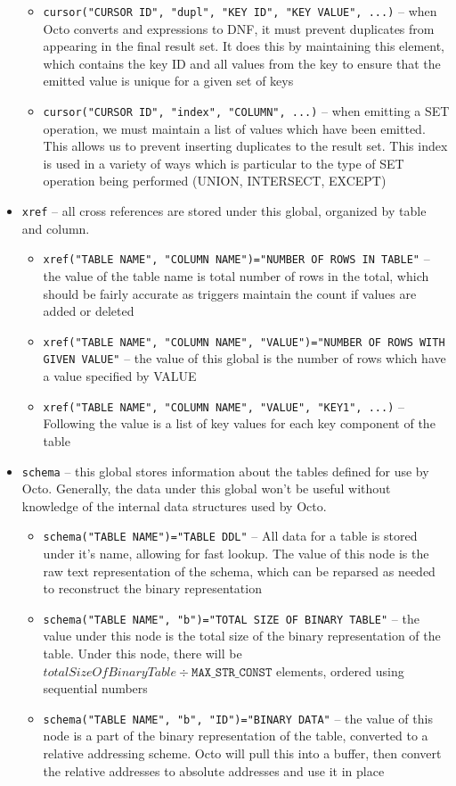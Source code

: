 \documentclass[]{article}
\def\code#1{\texttt{#1}}
\begin{document}
\begin{itemize}
\begin{itemize}
		\item \code{cursor("CURSOR ID", "dupl", "KEY ID", "KEY VALUE", ...)} -- when Octo converts and expressions to DNF, it must prevent duplicates from appearing in the final result set. It does this by maintaining this element, which contains the key ID and all values from the key to ensure that the emitted value is unique for a given set of keys
		\item \code{cursor("CURSOR ID", "index", "COLUMN", ...)} -- when emitting a SET operation, we must maintain a list of values which have been emitted. This allows us to prevent inserting duplicates to the result set. This index is used in a variety of ways which is particular to the type of SET operation being performed (UNION, INTERSECT, EXCEPT)
	\end{itemize}
	\item \code{xref} -- all cross references are stored under this global, organized by table and column.
	\begin{itemize}
		\item \code{xref("TABLE NAME", "COLUMN NAME")="NUMBER OF ROWS IN TABLE"} -- the value of the table name is total number of rows in the total, which should be fairly accurate as triggers maintain the count if values are added or deleted
		\item \code{xref("TABLE NAME", "COLUMN NAME", "VALUE")="NUMBER OF ROWS WITH GIVEN VALUE"} -- the value of this global is the number of rows which have a value specified by VALUE
		\item \code{xref("TABLE NAME", "COLUMN NAME", "VALUE", "KEY1", ...)} -- Following the value is a list of key values for each key component of the table
	\end{itemize}
	\item \code{schema} -- this global stores information about the tables defined for use by Octo. Generally, the data under this global won't be useful without knowledge of the internal data structures used by Octo.
	\begin{itemize}
		\item \code{schema("TABLE NAME")="TABLE DDL"} -- All data for a table is stored under it's name, allowing for fast lookup. The value of this node is the raw text representation of the schema, which can be reparsed as needed to reconstruct the binary representation
		\item \code{schema("TABLE NAME", "b")="TOTAL SIZE OF BINARY TABLE"} -- the value under this node is the total size of the binary representation of the table. Under this node, there will be $totalSizeOfBinaryTable \div \code{MAX\_STR\_CONST}$ elements, ordered using sequential numbers
		\item \code{schema("TABLE NAME", "b", "ID")="BINARY DATA"} -- the value of this node is a part of the binary representation of the table, converted to a relative addressing scheme. Octo will pull this into a buffer, then convert the relative addresses to absolute addresses and use it in place
	\end{itemize}
\end{itemize}
\end{document}
